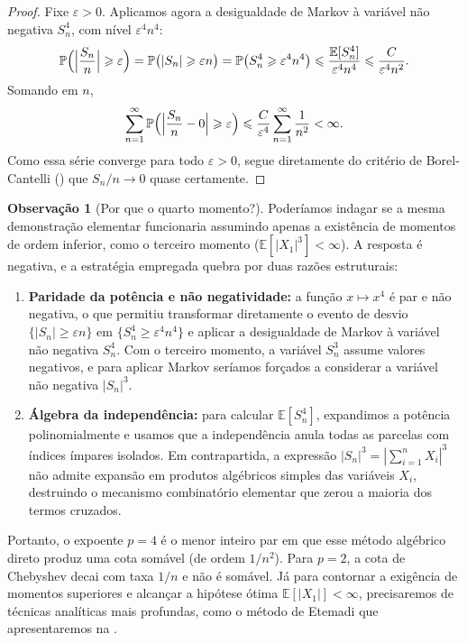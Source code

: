 \documentclass[12pt,portuguese]{article}
\theoremstyle{definition}
\newtheorem{remark}[remark]{Observação}
\theoremstyle{plainexercise}
\theoremstyle{starredexercise}
\theoremstyle{definition}
\begin{document}
\begin{proof}
Fixe $\varepsilon>0$. Aplicamos agora a desigualdade de Markov à variável
não negativa $S_n^4$, com nível $\varepsilon^4n^4$:
\[
\mathbb{P}\Bigl(\Bigl|\frac{S_n}{n}\Bigr|\geqslant\varepsilon\Bigr)
=
\mathbb{P}\bigl(|S_n|\geqslant\varepsilon n\bigr)
=
\mathbb{P}\bigl(S_n^4\geqslant\varepsilon^4n^4\bigr)
\leqslant
\frac{\mathbb{E}[S_n^4]}{\varepsilon^4n^4}
\leqslant
\frac{C}{\varepsilon^4n^2}.
\]
Somando em $n$,
\begin{equation}\label{eq:serie-quarta}
\sum_{n=1}^{\infty}\mathbb{P}\Bigl(\Bigl|\frac{S_n}{n}-0\Bigr|\geqslant\varepsilon\Bigr)
\leqslant
\frac{C}{\varepsilon^4}\sum_{n=1}^{\infty}\frac{1}{n^2}
<
\infty.
\end{equation}
Como essa série converge para todo $\varepsilon>0$, segue diretamente do critério de
Borel-Cantelli () que $S_n/n\to0$ quase certamente.
\end{proof}

\begin{remark}[Por que o quarto momento?]\label{rem:por-que-quarto-momento}
Poderíamos indagar se a mesma demonstração elementar funcionaria assumindo
apenas a existência de momentos de ordem inferior, como o terceiro momento
($\mathbb{E}[|X_1|^3]<\infty$). A resposta é negativa, e a estratégia empregada
quebra por duas razões estruturais:
\begin{enumerate}
\item[(i)] \textbf{Paridade da potência e não negatividade:} a função $x\mapsto x^4$
é par e não negativa, o que permitiu transformar diretamente o evento de desvio
$\{|S_n|\geqslant\varepsilon n\}$ em $\{S_n^4\geqslant\varepsilon^4 n^4\}$ e
aplicar a desigualdade de Markov à variável não negativa $S_n^4$. Com o terceiro
momento, a variável $S_n^3$ assume valores negativos, e para aplicar Markov
seríamos forçados a considerar a variável não negativa $|S_n|^3$.
\item[(ii)] \textbf{Álgebra da independência:} para calcular $\mathbb{E}[S_n^4]$,
expandimos a potência polinomialmente e usamos que a independência anula todas
as parcelas com índices ímpares isolados. Em contrapartida, a expressão
$|S_n|^3=|\sum_{i=1}^n X_i|^3$ não admite expansão em produtos algébricos simples
das variáveis $X_i$, destruindo o mecanismo combinatório elementar que zerou a
maioria dos termos cruzados.
\end{enumerate}
Portanto, o expoente $p=4$ é o menor inteiro par em que esse método algébrico
direto produz uma cota somável (de ordem $1/n^2$). Para $p=2$, a cota de
Chebyshev decai com taxa $1/n$ e não é somável. Já para contornar a exigência de
momentos superiores e alcançar a hipótese ótima $\mathbb{E}[|X_1|]<\infty$,
precisaremos de técnicas analíticas mais profundas, como o método de Etemadi
que apresentaremos na .
\end{remark}
\end{document}
